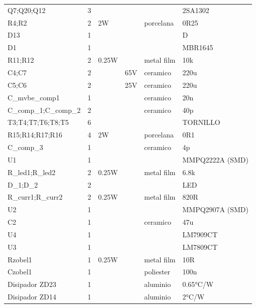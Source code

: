 \documentclass[a4paper,12pt,twoside]{article}
\begin{document}
\begin{table}[h!]
\begin{tabular}{@{}llllll@{}}
Q7;Q20;Q12            & 3        &           &           &            & 2SA1302   \\
R4;R2                 & 2        &  2W       &           &  porcelana & 0R25      \\
D13                   & 1        &           &           &            & D         \\
D1                    & 1        &           &           &            & MBR1645   \\
R11;R12               & 2        &  0.25W    &           &  metal film& 10k       \\
C4;C7                 & 2        &           & 65V       &  ceramico  & 220u      \\
C5;C6                 & 2        &           & 25V       &  ceramico  & 220u      \\
C\_mvbe\_comp1        & 1        &           &           &  ceramico  & 20n       \\
C\_comp\_1;C\_comp\_2 & 2        &           &           &  ceramico  & 40p       \\
T3;T4;T7;T6;T8;T5     & 6        &           &           &            & TORNILLO  \\
R15;R14;R17;R16       & 4        &  2W       &           &  porcelana & 0R1       \\
C\_comp\_3            & 1        &           &           &  ceramico  & 4p        \\
U1                    & 1        &           &           &            & MMPQ2222A (SMD) \\
R\_led1;R\_led2       & 2        &  0.25W    &           &  metal film& 6.8k      \\
D\_1;D\_2             & 2        &           &           &            & LED       \\
R\_curr1;R\_curr2     & 2        &  0.25W    &           &  metal film& 820R      \\
U2                    & 1        &           &           &            & MMPQ2907A (SMD) \\
C2                    & 1        &           &           &  ceramico  & 47u       \\
U4                    & 1        &           &           &            & LM7909CT  \\
U3                    & 1        &           &           &            & LM7809CT  \\
Rzobel1               & 1        &  0.25W    &           &  metal film& 10R       \\
Czobel1               & 1        &           &           &  poliester & 100n      \\ 
Disipador ZD23        & 1        &           &           &  aluminio  & 0.65°C/W  \\  
Disipador ZD14        & 1        &           &           &  aluminio  & 2°C/W     \\ \bottomrule
\end{tabular}

\end{table}
\end{document}
